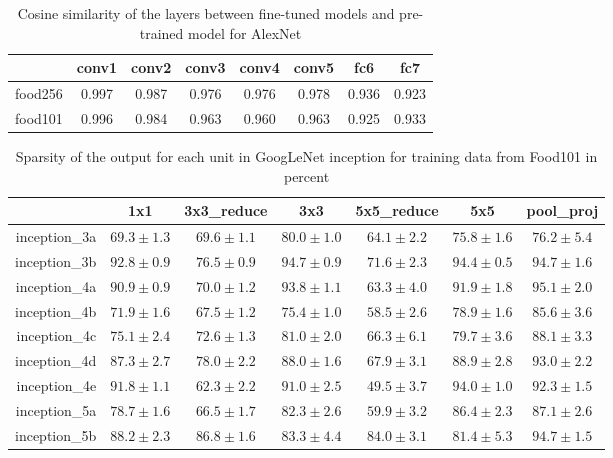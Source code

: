 \begin{table}[htbp]
  \centering
  \caption{Cosine similarity of the layers between fine-tuned models and pre-trained model for AlexNet}
    \begin{tabular}{r|ccccccc}
    \toprule
          & conv1 & conv2 & conv3 & conv4 & conv5 & fc6   & fc7 \\
    \midrule
    food256 & 0.997 & 0.987 & 0.976 & 0.976 & 0.978 & 0.936 & 0.923 \\
    food101 & 0.996 & 0.984 & 0.963 & 0.960 & 0.963 & 0.925 & 0.933 \\
    \bottomrule
    \end{tabular}%
  \label{tab:cosa}%
\end{table}%

\begin{table}[htbp]
  \centering
  \caption{Sparsity of the output for each unit in GoogLeNet inception for training data from Food101 in percent}
    \begin{tabular}{r|cccccc}
    \toprule
          & 1x1  & 3x3\_reduce & 3x3  & 5x5\_reduce & 5x5  & pool\_proj  \\
    \midrule
    inception\_3a & $69.3\pm 1.3$  & $69.6 \pm 1.1$  & $80.0\pm  1.0$& $64.1\pm  2.2$& $75.8\pm  1.6$& $76.2\pm 5.4$\\
    inception\_3b & $92.8 \pm 0.9$&$ 76.5 \pm 0.9$& $94.7\pm 0.9 $&$ 71.6 \pm 2.3 $&$ 94.4\pm 0.5 $&$ 94.7 \pm 1.6$\\
    inception\_4a & $90.9 \pm 0.9$& $70.0\pm 1.2 $& $93.8\pm 1.1 $& $63.3\pm 4.0 $& $91.9\pm 1.8 $& $95.1\pm 2.0$\\
    inception\_4b & $71.9 \pm 1.6$& $67.5\pm 1.2$ & $75.4\pm  1.0$& $58.5 \pm 2.6$& $78.9\pm  1.6$& $85.6\pm 3.6$\\
    inception\_4c & $75.1 \pm 2.4$& $72.6 \pm 1.3$& $81.0\pm 2.0$ & $66.3\pm 6.1 $& $79.7 \pm 3.6$& $88.1\pm 3.3$\\
    inception\_4d & $87.3 \pm 2.7$& $78.0 \pm 2.2$& $88.0\pm 1.6$& $67.9\pm 3.1 $& $88.9\pm 2.8 $& $93.0\pm 2.2$\\
    inception\_4e & $91.8\pm  1.1$& $62.3\pm 2.2 $& $91.0\pm 2.5 $& $49.5 \pm 3.7$& $94.0 \pm 1.0$& $92.3\pm 1.5$\\
    inception\_5a & $78.7 \pm 1.6$& $66.5\pm  1.7$& $82.3\pm 2.6 $& $59.9\pm 3.2 $& $86.4\pm 2.3 $& $87.1\pm 2.6$\\
    inception\_5b & $88.2\pm 2.3 $& $86.8 \pm 1.6$&$ 83.3\pm 4.4$ & $84.0\pm 3.1 $& $81.4\pm 5.3$  & $94.7\pm 1.5$\\
    \bottomrule
    \end{tabular}%
  \label{tab:addlabel}%
\end{table}%

